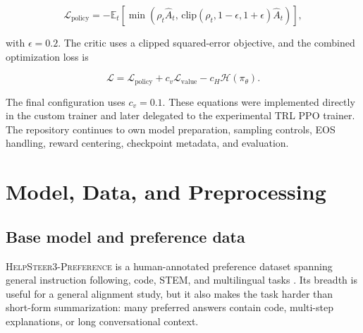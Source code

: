 \documentclass[11pt]{article}
\newcommand{\dataset}{\textsc{HelpSteer3-Preference}}
\newcommand{\trl}{\textsc{TRL}}
\begin{document}
\begin{equation}
\mathcal{L}_{\mathrm{policy}}
=
-\mathbb{E}_t\left[
\min\left(
\rho_t\hat{A}_t,\,
\mathrm{clip}(\rho_t,1-\epsilon,1+\epsilon)\hat{A}_t
\right)
\right],
\label{eq:ppo}
\end{equation}

with $\epsilon=0.2$. The critic uses a clipped squared-error objective, and the
combined optimization loss is

\begin{equation}
\mathcal{L}
=
\mathcal{L}_{\mathrm{policy}}
+
c_v\mathcal{L}_{\mathrm{value}}
-
c_H\mathcal{H}(\pi_\theta).
\end{equation}

The final configuration uses $c_v=0.1$. These equations were implemented
directly in the custom trainer and later delegated to the experimental
\trl{} PPO trainer. The repository continues to own model preparation,
sampling controls, EOS handling, reward centering, checkpoint metadata, and
evaluation.

\section{Model, Data, and Preprocessing}

\subsection{Base model and preference data}

\dataset{} is a human-annotated preference dataset spanning general
instruction following, code, STEM, and multilingual tasks
\cite{wang2025}. Its breadth is useful for a general alignment study, but it
also makes the task harder than short-form summarization: many preferred
answers contain code, multi-step explanations, or long conversational context.
\end{document}
